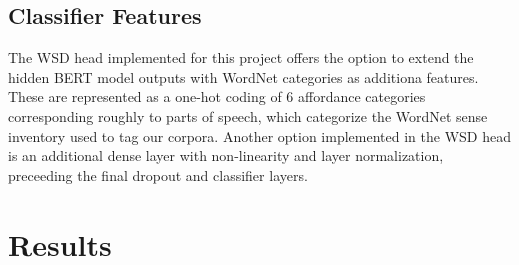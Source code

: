 \documentclass{IEEEtran}
\begin{document}
\subsection{Classifier Features}
	The WSD head implemented for this project offers the option to extend the hidden BERT model outputs with WordNet categories as additiona features.  These are represented as a one-hot coding of 6 affordance categories corresponding roughly to parts of speech, which categorize the WordNet sense inventory used to tag our corpora.  Another option implemented in the WSD head is an additional dense layer with non-linearity and layer normalization, preceeding the final dropout and classifier layers.  
\section{Results}
\end{document}
